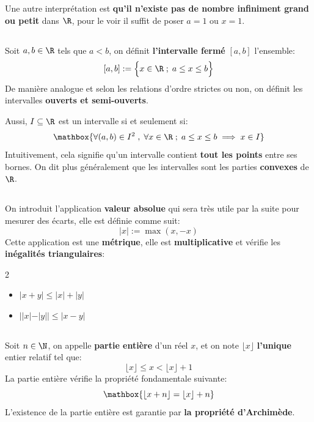 Une autre interprétation est \textbf{qu'il n'existe pas de nombre infiniment grand ou petit} dans \(\R\), pour le voir il suffit de poser \(a = 1\) ou \(x = 1\).
\pagebreak

\subsection*{}
Soit \(a, b \in \R\) tels que \(a < b\), on définit \textbf{l'intervalle fermé} \([a, b]\) l'ensemble:
\[
    [a, b] := \Bigl\{ x\in \R \; ; \; a \leq x \leq b \Bigl\}
\]
De manière analogue et selon les relations d'ordre strictes ou non, on définit les intervalles \textbf{ouverts et semi-ouverts}.\<

Aussi, \(I \subseteq \R\) est un intervalle si et seulement si:
\begin{align*}
    \mathbox{
        \forall (a, b) \in I^2 \; , \; \forall x \in \R \; ; \; a \leq x \leq b \implies x \in I
    }
\end{align*}
Intuitivement, cela signifie qu'un intervalle contient \textbf{tout les points} entre ses bornes.\+
On dit plus généralement que les intervalles sont les parties \textbf{convexes} de \(\R\).

\subsection*{}
On introduit l'application \textbf{valeur absolue} qui sera très utile par la suite pour mesurer des écarts, elle est définie comme suit:
\[
    |x| := \max(x, -x)
\]
Cette application est une \textbf{métrique}, elle est \textbf{multiplicative} et vérifie les \textbf{inégalités triangulaires}:
\begin{multicols}{2}
    \begin{itemize}
        \item \(|x + y| \leq |x| + |y|\)
        \item \(||x| - |y|| \leq |x - y|\)
    \end{itemize}
\end{multicols}

\subsection*{}
Soit \(n \in \N\), on appelle \textbf{partie entière} d'un réel \(x\), et on note \(\lfloor x \rfloor\) \textbf{l'unique} entier relatif tel que:
\[
    \lfloor x \rfloor \leq x < \lfloor x \rfloor + 1
\]
La partie entière vérifie la propriété fondamentale suivante:
\[
    \mathbox{
        \lfloor x + n \rfloor = \lfloor x \rfloor + n
    }
\]
L'existence de la partie entière est garantie par \textbf{la propriété d'Archimède}.
